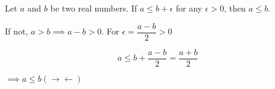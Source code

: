 Let $a$ and $b$ be two real numbers. If $a \leq b + \epsilon$ for any $\epsilon > 0$, then $a \leq b$.

\begin{tcolorbox}
	\begin{solution}
		If not, $a>b \implies a-b > 0$. For $\epsilon = \dfrac{a-b}{2} > 0$
		
		$$a \leq b + \dfrac{a - b}{2} = \dfrac{a + b}{2}$$
		
		$\implies a \leq b (\rightarrow \leftarrow)$
	\end{solution}
\end{tcolorbox}